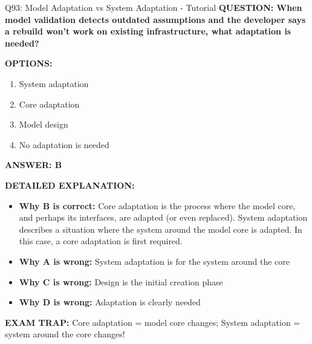 \documentclass[8pt]{beamer}
\begin{document}
	\begin{frame}{Q93: Model Adaptation vs System Adaptation - Tutorial}
		\fontsize{6.5}{7.5}\selectfont
		\textbf{QUESTION: When model validation detects outdated assumptions and the developer says a rebuild won't work on existing infrastructure, what adaptation is needed?}
		
		\vspace{0.1cm}
		\textbf{OPTIONS:}
		\begin{enumerate}
			\item System adaptation
			\item Core adaptation
			\item Model design
			\item No adaptation is needed
		\end{enumerate}
		
		\vspace{0.1cm}
		\textcolor{myblue}{\textbf{ANSWER: B}}
		
		\vspace{0.1cm}
		\textbf{DETAILED EXPLANATION:}
		\begin{itemize}
			\item \textbf{Why B is correct:} Core adaptation is the process where the model core, and perhaps its interfaces, are adapted (or even replaced). System adaptation describes a situation where the system around the model core is adapted. In this case, a core adaptation is first required.
			\item \textbf{Why A is wrong:} System adaptation is for the system around the core
			\item \textbf{Why C is wrong:} Design is the initial creation phase
			\item \textbf{Why D is wrong:} Adaptation is clearly needed
		\end{itemize}
		
		\textcolor{myred}{\textbf{EXAM TRAP:}} Core adaptation = \textcolor{myblue}{model core changes}; System adaptation = \textcolor{myblue}{system around the core changes}!
	\end{frame}
	
\end{document}
